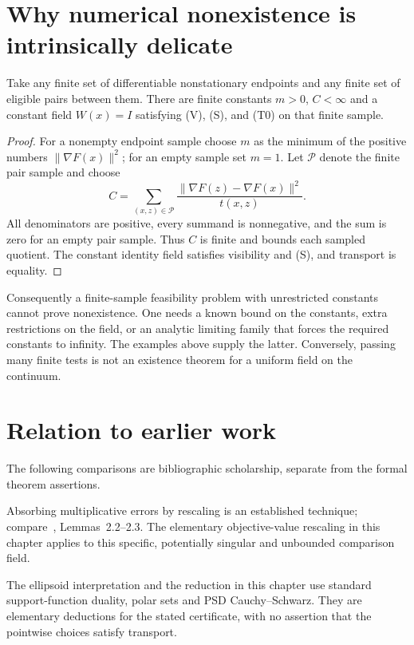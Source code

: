 \section{Why numerical nonexistence is intrinsically delicate}
\begin{proposition}
Take any finite set of differentiable nonstationary endpoints and any finite set of eligible pairs between them. There are finite constants $m>0$, $C<\infty$ and a constant field $W(x)=I$ satisfying (V), (S), and (T0) on that finite sample.
\end{proposition}
\begin{proof}
For a nonempty endpoint sample choose $m$ as the minimum of the positive numbers $\|\nabla F(x)\|^2$; for an empty sample set $m=1$. Let $\mathcal P$ denote the finite pair sample and choose
\[
 C=\sum_{(x,z)\in\mathcal P}
       \frac{\|\nabla F(z)-\nabla F(x)\|^2}{t(x,z)}.
\]
All denominators are positive, every summand is nonnegative, and the sum is zero for an empty pair sample. Thus $C$ is finite and bounds each sampled quotient. The constant identity field satisfies visibility and (S), and transport is equality.
\end{proof}
Consequently a finite-sample feasibility problem with unrestricted constants cannot prove nonexistence. One needs a known bound on the constants, extra restrictions on the field, or an analytic limiting family that forces the required constants to infinity. The examples above supply the latter. Conversely, passing many finite tests is not an existence theorem for a uniform field on the continuum.


\endgroup


\section*{Relation to earlier work}
The following comparisons are bibliographic scholarship, separate from the formal theorem assertions.

Absorbing multiplicative errors by rescaling is an established technique; compare~\cite{FND_CV13}, Lemmas~2.2--2.3. The elementary objective-value rescaling in this chapter applies to this specific, potentially singular and unbounded comparison field.

The ellipsoid interpretation and the reduction in this chapter use standard support-function duality, polar sets and PSD Cauchy--Schwarz. They are elementary deductions for the stated certificate, with no assertion that the pointwise choices satisfy transport.

